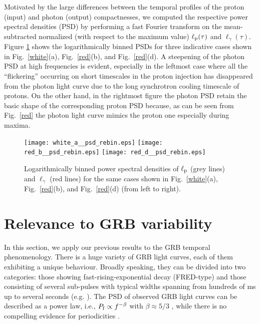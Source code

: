 \documentclass[fleqn,usenatbib]{mnras}
\newcommand{\lp}{\ell_{\rm p}}
\newcommand{\lph}{\ell_{\gamma}}
\begin{document}
{Motivated by the large differences between the temporal profiles of the proton (input) and photon (output) compactnesses, we computed the respective power spectral densities (PSD) by performing a fast Fourier transform on the mean-subtracted normalized (with respect to the maximum value) $\lp(\tau)$ and  $\lph(\tau)$. Figure \ref{psd} shows the logarithmically binned PSDs for three indicative cases shown in Fig.~\ref{white}(a), Fig.~\ref{red}(b), and Fig.~\ref{red}(d). A steepening of the photon PSD at high frequencies is evident, especially in the leftmost case where all the ``flickering'' occurring on short timescales in the proton injection has disappeared from the photon light curve due to the long synchrotron cooling timescale of protons. On the other hand, in the rightmost figure
the photon PSD retain the basic shape of the corresponding proton PSD because, as can be seen from Fig.~\ref{red} the photon light curve mimics the proton one especially during maxima.

\begin{figure*}
 \centering 
 \texttt{[image: white\_a\_\_psd\_rebin.eps]} 
 \texttt{[image: red\_b\_\_psd\_rebin.eps]} 
 \texttt{[image: red\_d\_\_psd\_rebin.eps]} 
 \caption{Logarithmically binned power spectral densities of $\lp$ (grey lines) and $\ell_{\gamma}$ (red lines) for the same cases shown in Fig.~\ref{white}(a),  Fig.~\ref{red}(b), and Fig.~\ref{red}(d) (from left to right).} 
 \label{psd}
\end{figure*}

\section{Relevance to GRB variability}\label{sec:grb}
In this section, we apply our previous results to the GRB 
temporal phenomenology. There is a huge variety of GRB light curves, each of them exhibiting a unique behaviour. Broadly speaking,
they can be divided into two categories: those showing fast-rising-exponential decay (FRED-type)
and those consisting of several sub-pulses with typical widths spanning from hundreds of ms up
to several seconds (e.g. \cite{norris96}). The PSD of observed GRB light curves can be described as a power law, i.e., $P_{\rm f}\propto f^{-\beta}$ with $\beta \approx 5/3$ \citep{belo00,dichiara13}, while there is no compelling evidence for periodicities \citep{guidorzi16}. 
 
}
\end{document}
